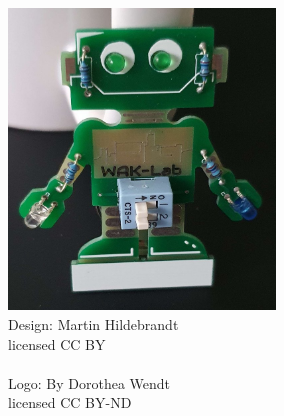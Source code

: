 \documentclass[a4paper]{article}
\begin{document}
\maketitle
\begin{center}
\includegraphics[height=8cm]{../pictures/RoboAus.jpg}
\ \\
Design: Martin Hildebrandt\\
licensed CC BY\\
\ \\
Logo: By Dorothea Wendt\\
licensed CC BY-ND\\
\end{center}
\newpage
\end{document}
